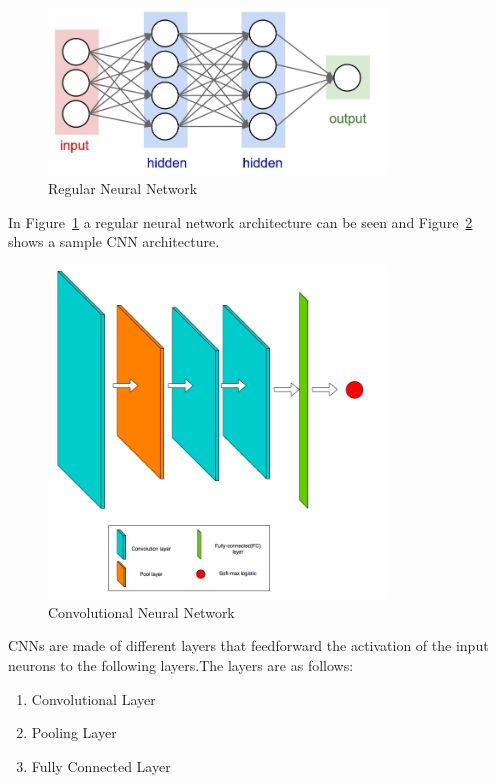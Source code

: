 \begin{figure}[t]
\centering
\includegraphics[width=0.8\textwidth]{Figures/regnn}
\caption{Regular Neural Network}
\label{figregnn}
\end{figure}

In Figure~\ref{figregnn} a regular neural network architecture can be seen and Figure~\ref{figconvnet} shows a sample CNN architecture.

\begin{figure}[t]
\centering
\includegraphics[width=0.8\textwidth]{Figures/convnet}
\caption{Convolutional Neural Network}
\label{figconvnet}
\end{figure}

CNNs are made of different layers that feedforward the activation of the input neurons to the following layers.The layers are as follows:

\begin{enumerate}
    \item Convolutional Layer
    \item Pooling Layer
    \item Fully Connected Layer
\end{enumerate}

